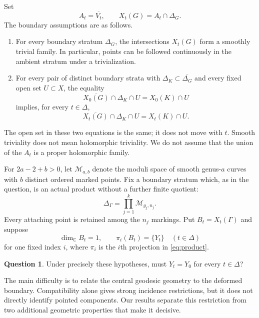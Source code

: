 \documentclass[11pt]{article}
\newcommand{\M}{\mathcal M}
\newcommand{\C}{\mathbb C}
\newcommand{\cl}[1]{\overline{#1}}
\theoremstyle{definition}
\newtheorem{question}[theorem]{Question}
\theoremstyle{remark}
\begin{document}
Set
\[
 A_t=\cl{V_t},\qquad X_t(G)=A_t\cap\Delta_G.
\]
The boundary assumptions are as follows.
\begin{enumerate}[label=(\roman*),leftmargin=*]
\item\label{hyp:trivial} For every boundary stratum $\Delta_G$, the intersections $X_t(G)$ form a smoothly trivial family. In particular, points can be followed continuously in the ambient stratum under a trivialization.
\item\label{hyp:compat} For every pair of distinct boundary strata with $\Delta_K\subset\cl{\Delta_G}$ and every fixed open set $U\subset X$, the equality
\begin{equation}\label{eq:central-incidence}
 \cl{X_0(G)}\cap\Delta_K\cap U=X_0(K)\cap U
\end{equation}
implies, for every $t\in\Delta$,
\begin{equation}\label{eq:deformed-incidence}
 \cl{X_t(G)}\cap\Delta_K\cap U=X_t(K)\cap U.
\end{equation}
\end{enumerate}
The open set in these two equations is the same; it does not move with $t$. Smooth triviality does not mean holomorphic triviality. We do not assume that the union of the $A_t$ is a proper holomorphic family.

For $2a-2+b>0$, let $\M_{a,b}$ denote the moduli space of smooth genus-$a$ curves with $b$ distinct ordered marked points. Fix a boundary stratum which, as in the question, is an actual product without a further finite quotient:
\begin{equation}\label{eq:product}
 \Delta_\Gamma=\prod_{j=1}^k\M_{g_j,n_j}.
\end{equation}
Every attaching point is retained among the $n_j$ markings. Put $B_t=X_t(\Gamma)$ and suppose
\begin{equation}\label{eq:singleton}
 \dim_{\C}B_t=1,\qquad \pi_i(B_t)=\{Y_t\}
 \quad(t\in\Delta)
\end{equation}
for one fixed index $i$, where $\pi_i$ is the $i$th projection in \eqref{eq:product}.

\begin{question}\label{q:original}
Under precisely these hypotheses, must $Y_t=Y_0$ for every $t\in\Delta$?
\end{question}

The main difficulty is to relate the central geodesic geometry to the deformed boundary. Compatibility alone gives strong incidence restrictions, but it does not directly identify pointed components. Our results separate this restriction from two additional geometric properties that make it decisive.
\end{document}
